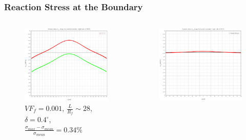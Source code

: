 \documentclass[first,firstsupp,lastsupp,last,hyperref,table]{ETHclass}
\begin{document}
\begin{frame}
\frametitle{\small Reaction Stress at the Boundary}
\vspace{-0.5cm}
\centering
\begin{columns}
\begin{column}{0.55\textwidth}
\begin{figure}
\includegraphics[width=\columnwidth]{2017-06-23_AbqRunSummary_SingleFiberEqRfFiniteStrain_sigmaatboundary_Summary.pdf}
\caption{\scriptsize $VF_{f}=0.001$, $\frac{L}{R_{f}}\sim 28$, $\delta = 0.4^{\circ}$, $\frac{\sigma_{max}-\sigma_{mean}}{\sigma_{mean}}=0.34\%$}
\end{figure}
\end{column}
\begin{column}{0.55\textwidth}
\begin{figure}
\includegraphics[width=\columnwidth]{2017-06-16_AbqRunSummary_SingleFiberEqRfSmallStrain-D0-4_sigmaatboundary_Summary.pdf}

\end{figure}
\end{column}
\end{columns}
\end{frame}
\end{document}

